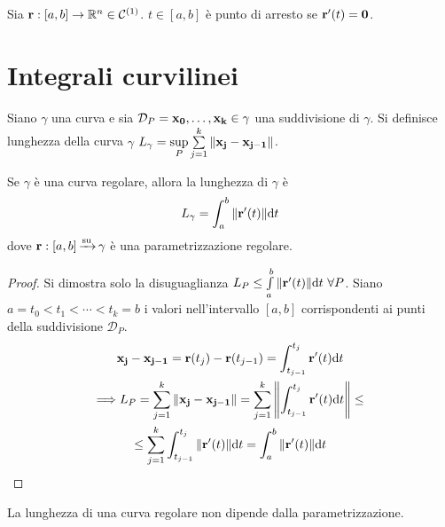 \begin{definition}
	Sia $\vb{r} :[a,b] \to \mathbb{R}^n\in \mathcal{C}^{(1)}$. $t \in [a,b]$ è punto di arresto se $\vb{r}'(t) = \vb{0}$.
\end{definition}

\section{Integrali curvilinei}

\begin{definition}
	Siano $\gamma$ una curva e sia $\mathcal{D}_P=\vb{x_0},\dots,\vb{x_k}\in \gamma$ una suddivisione di $\gamma$. Si definisce lunghezza della curva $\gamma$ $L_\gamma = \sup\limits_{P}\sum\limits_{j=1}^{k}\norm{\vb{x_j}-\vb{x_{j-1}}}$.
\end{definition}

\begin{theorem}
	Se $\gamma$ è una curva regolare, allora la lunghezza di $\gamma$ è
	$$
		L_\gamma = \int_a^b\norm{\vb{r}'(t)}\dd t
	$$
	dove $\vb{r}: [a,b]\operatorname{\xrightarrow{\operatorname{su}}} \gamma$ è una parametrizzazione regolare.
\end{theorem}

\begin{proof}
	Si dimostra solo la disuguaglianza $L_P \leq \int\limits_{a}^{b}\norm{\vb{r}'(t)}\dd t \ \forall P$. Siano $a=t_0<t_1<\cdots<t_k=b$ i valori nell'intervallo $[a,b]$ corrispondenti ai punti della suddivisione $\mathcal{D}_P$.
	\begin{gather*}
		\vb{x_j}-\vb{x_{j-1}}=\vb{r}(t_j)-\vb{r}(t_{j-1})=\int_{t_{j-1}}^{t_j}\vb{r}'(t)\dd t\\
		\Longrightarrow L_P=\sum_{j=1}^{k}\norm{\vb{x_j}-\vb{x_{j-1}}}=\sum_{j=1}^{k}\norm{\int_{t_{j-1}}^{t_j}\vb{r}'(t)\dd t}\leq\\
		\leq\sum_{j=1}^{k}\int_{t_{j-1}}^{t_j}\norm{\vb{r}'(t)}\dd t=\int_{a}^{b}\norm{\vb{r}'(t)}\dd t
	\end{gather*}
\end{proof}

\begin{prop}
	La lunghezza di una curva regolare non dipende dalla parametrizzazione.
\end{prop}

